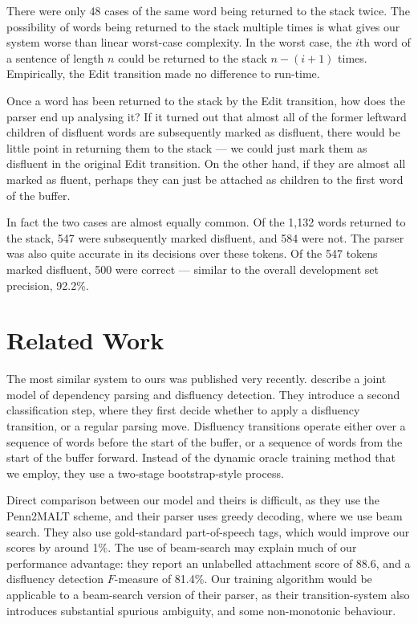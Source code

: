 \documentclass[11pt,letterpaper]{article}
\begin{document}
There were only 48 cases of the same word being returned to the stack twice. The
possibility of words being returned to the stack multiple times is what gives our
system worse than linear worst-case complexity. In the worst case, the $i$th word
of a sentence of length $n$ could be returned to the stack $n-(i+1)$ times.
Empirically, the Edit transition made no difference to run-time.

Once a word has been returned to the stack by the Edit transition, how does the
parser end up analysing it?  If it turned out that almost all of the former leftward
children of disfluent words are subsequently marked as disfluent, there would
be little point in returning them to the stack --- we could just mark them as
disfluent in the original Edit transition.  On the other hand, if they are
almost all marked as fluent, perhaps they can just be attached as children
to the first word of the buffer.

In fact the two cases are almost equally common.  Of the 1,132 words returned
to the stack, 547 were subsequently marked disfluent, and 584 were not.  The
parser was also quite accurate in its decisions over these tokens.  Of the 547
tokens marked disfluent, 500 were correct --- similar to the overall development set 
precision, 92.2\%.

\section{Related Work}

The most similar system to ours was published very recently.
\citet{rasooli:13} describe a joint model of dependency
parsing and disfluency detection. They introduce a second classification step,
where they first decide whether to apply a disfluency transition, or a regular
parsing move. Disfluency transitions operate either over a sequence of words
before the start of the buffer, or a sequence of words from the start of the
buffer forward. Instead of the dynamic oracle training method that we employ,
they use a two-stage bootstrap-style process.

Direct comparison between our model and theirs is difficult,
as they use the Penn2MALT scheme, and their parser uses greedy decoding, where we use
beam search. They also use gold-standard part-of-speech tags, which would
improve our scores by around 1\%.
The use of beam-search may explain much of our performance advantage:
they report an unlabelled attachment score of 88.6, and a disfluency detection
$F$-measure of 81.4\%.  Our training algorithm would be applicable to a
beam-search version of their parser, as their transition-system also introduces
substantial spurious ambiguity, and some non-monotonic behaviour.
\end{document}
